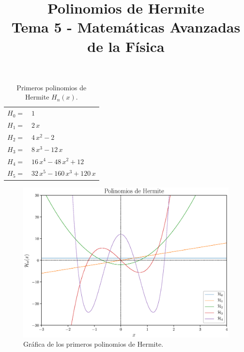 
\usepackage{titling}
\setlength{\jot}{12pt}
\title{Polinomios de Hermite \\ {\large Tema 5 - Matemáticas Avanzadas de la Física}\vspace{-2.5\baselineskip}}
\author{}
\date{}

\maketitle
\fontsize{14}{14}\selectfont

\begin{table}[hbt!]
\centering
\begin{tabular}{l l}
$H_{0} =$ & $1$ \\
$H_{1} =$ & $2 \, x$ \\
$H_{2} =$ & $4 \, x^{2} - 2 $ \\
$H_{3} =$ & $8 \, x^{3} - 12 \, x$ \\
$H_{4} =$ & $16 \, x^{4} - 48 \, x^{2} + 12 $ \\
$H_{5} =$ & $32 \, x^{5} - 160 \, x^{3} + 120 \, x $
\end{tabular}
\caption{Primeros polinomios de Hermite $H_{n}(x)$.}
\label{tabla_001}
\end{table}

\begin{figure}[h!]
\centering
\includegraphics[scale=0.5]{Imagenes/Polinomios_Hermite_01.eps}
\caption{Gráfica de los primeros polinomios de Hermite.}
\label{figura_003}
\end{figure}

